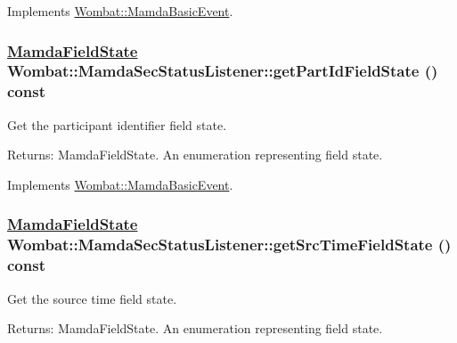 Implements \hyperlink{classWombat_1_1MamdaBasicEvent_ef95e19f4babb0e5ea8549d6cf29d13f}{Wombat::Mamda\-Basic\-Event}.\hypertarget{classWombat_1_1MamdaSecStatusListener_1915e75d55253a45e543bffe36393803}{
\subsubsection[getPartIdFieldState]{\setlength{\rightskip}{0pt plus 5cm}\hyperlink{namespaceWombat_93aac974f2ab713554fd12a1fa3b7d2a}{Mamda\-Field\-State} Wombat::Mamda\-Sec\-Status\-Listener::get\-Part\-Id\-Field\-State () const}}
\label{classWombat_1_1MamdaSecStatusListener_1915e75d55253a45e543bffe36393803}


Get the participant identifier field state. 

\begin{Desc}
\item[Returns:]Mamda\-Field\-State. An enumeration representing field state. \end{Desc}


Implements \hyperlink{classWombat_1_1MamdaBasicEvent_c361c99af2cf7eb9f5621d89f744fc62}{Wombat::Mamda\-Basic\-Event}.\hypertarget{classWombat_1_1MamdaSecStatusListener_6d515670385459d9ac8165a9edc9f364}{
\subsubsection[getSrcTimeFieldState]{\setlength{\rightskip}{0pt plus 5cm}\hyperlink{namespaceWombat_93aac974f2ab713554fd12a1fa3b7d2a}{Mamda\-Field\-State} Wombat::Mamda\-Sec\-Status\-Listener::get\-Src\-Time\-Field\-State () const}}
\label{classWombat_1_1MamdaSecStatusListener_6d515670385459d9ac8165a9edc9f364}


Get the source time field state. 

\begin{Desc}
\item[Returns:]Mamda\-Field\-State. An enumeration representing field state. \end{Desc}


